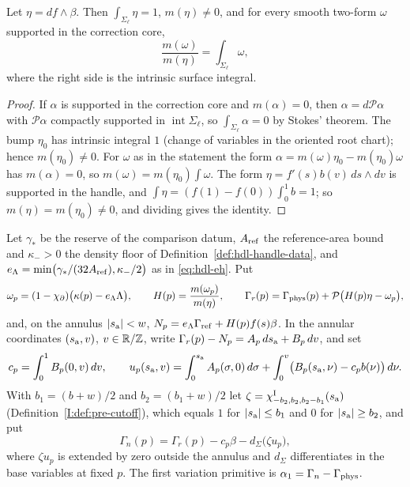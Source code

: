 \begin{lemma}\label{lem:native-calibration}
Let $\eta=df\wedge\beta$. Then $\int_{\Sigma_\ell}\eta=1$, $m(\eta)\ne0$, and for every smooth two-form $\omega$ supported in the
correction core,
\[
 \frac{m(\omega)}{m(\eta)}=\int_{\Sigma_\ell}\omega ,
\]
where the right side is the intrinsic surface integral.
\end{lemma}

\begin{proof}
If $\alpha$ is supported in the correction core and $m(\alpha)=0$, then $\alpha=d\mathcal P\alpha$ with $\mathcal P\alpha$ compactly
supported in $\operatorname{int}\Sigma_\ell$, so $\int_{\Sigma_\ell}\alpha=0$ by Stokes' theorem. The bump $\eta_0$ has intrinsic
integral $1$ (change of variables in the oriented root chart); hence $m(\eta_0)\ne0$. For $\omega$ as in the statement the form
$\alpha=m(\omega)\eta_0-m(\eta_0)\omega$ has $m(\alpha)=0$, so $m(\omega)=m(\eta_0)\int\omega$. The form $\eta=f'(s)b(v)\,ds\wedge
dv$ is supported in the handle, and $\int\eta=(f(1)-f(0))\int_0^1b=1$; so $m(\eta)=m(\eta_0)\ne0$, and dividing gives the identity.
\end{proof}

\begin{construction}\label{cons:native-normalization}
Let $\gamma_*$ be the reserve of the comparison datum, $A_{\rm ref}$ the reference-area bound and $\kappa_->0$ the density floor of
Definition~\ref{def:hdl-handle-data}, and $e_\Lambda=\min\bigl(\gamma_*/(32A_{\rm ref}),\kappa_-/2\bigr)$ as in
\eqref{eq:hdl-eh}. Put
\[
 \omega_p=(1-\chi_\partial)\bigl(\kappa(p)-e_\Lambda\Lambda\bigr),\qquad
 H(p)=\frac{m(\omega_p)}{m(\eta)},\qquad
 \Gamma_r(p)=\Gamma_{\rm phys}(p)+\mathcal P\bigl(H(p)\eta-\omega_p\bigr),
\]
and, on the annulus $|s_{\rm a}|<w$, $N_p=e_\Lambda\Gamma_{\rm ref}+H(p)f(s)\beta$. In the annular coordinates $(s_{\rm a},v)$,
$v\in\mathbb{R}/\mathbb{Z}$, write $\Gamma_r(p)-N_p=A_p\,ds_{\rm a}+B_p\,dv$, and set
\[
 c_p=\int_0^1B_p(0,v)\,dv,\qquad
 u_p(s_{\rm a},v)=\int_0^{s_{\rm a}}A_p(\sigma,0)\,d\sigma+\int_0^v\bigl(B_p(s_{\rm a},\nu)-c_pb(\nu)\bigr)\,d\nu .
\]
With $b_1=(b+w)/2$ and $b_2=(b_1+w)/2$ let $\zeta=\chi^{\rm I}_{-b_2,b_2,b_2-b_1}(s_{\rm a})$ (Definition~\ref{I:def:pre-cutoff}),
which equals $1$ for $|s_{\rm a}|\le b_1$ and $0$ for $|s_{\rm a}|\ge b_2$, and put
\[
 \Gamma_n(p)=\Gamma_r(p)-c_p\beta-d_\Sigma\bigl(\zeta u_p\bigr),
\]
where $\zeta u_p$ is extended by zero outside the annulus and $d_\Sigma$ differentiates in the base variables at fixed $p$. The
first variation primitive is $\alpha_1=\Gamma_n-\Gamma_{\rm phys}$.
\end{construction}

